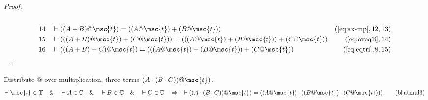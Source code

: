 \begin{proof}
\begin{align}
  \\ 14 &&  & \vdash ( ( A + B ) @ \msc{t} ) = ( ( A @ \msc{t} ) + ( B @ \msc{t} ) )&(\mbox{\ref{eq:ax-mp}},12,13)\notag
  \\ 15 &&  & \vdash ( ( ( A + B ) @ \msc{t} ) + ( C @ \msc{t} ) ) = ( ( ( A @ \msc{t} ) + ( B @ \msc{t} ) ) + ( C @ \msc{t} ) )&(\mbox{\ref{eq:oveq1i}},14)\notag
  \\ 16 &&  & \vdash ( ( ( A + B ) + C ) @ \msc{t} ) = ( ( ( A @ \msc{t} ) + ( B @ \msc{t} ) ) + ( C @ \msc{t} ) )&(\mbox{\ref{eq:eqtri}},8,15)\notag
\end{align}
\end{proof}

\begin{lemma} Distribute @ over multiplication, three
terms $( A \cdot ( B \cdot C ) ) @ \msc{t} )$.
\begin{align}
\vdash \msc{t} \in \mathbf{T}\quad\&\quad \vdash A \in \mathbb{C}\quad\&\quad
    \vdash B \in \mathbb{C}\quad\&\quad \vdash C \in
    \mathbb{C}\quad\Rightarrow\quad \vdash ( ( A \cdot ( B \cdot C ) ) @
    \msc{t} ) = ( ( A @ \msc{t} ) \cdot ( ( B @ \msc{t} ) \cdot ( C @ \msc{t} )
    ) )\label{eq:bl.atmul3}\tag{bl.atmul3}
\end{align}
\end{lemma}

